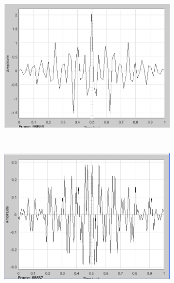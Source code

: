 \documentclass{report}
\begin{document}
\begin{figure}[b]
	\centering
	\begin{subfigure}[b]{0.4\textwidth}
	\includegraphics[width=0.7\linewidth]{hamard_altacorr}
\caption{}
\label{fig:hamardaltacorr}
	\end{subfigure}
	~ %
	\begin{subfigure}[b]{0.4\textwidth}
	\includegraphics[width=0.7\linewidth]{hamard_bajacorr}
\caption{}
\label{fig:hamardbajacorr}
	\end{subfigure}
\end{figure}



%
\end{document}
